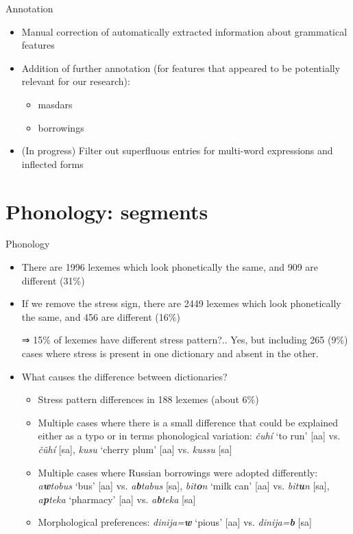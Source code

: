 \begin{frame}{Annotation}
\begin{itemize}
    \item Manual correction of automatically extracted information about grammatical features
    \item Addition of further annotation (for features that appeared to be potentially relevant for our research):
    \begin{itemize}
        \item masdars
        \item borrowings
    \end{itemize}
    \item (In progress) Filter out superfluous entries for multi-word expressions and inflected forms
\end{itemize}
    
\end{frame}

\section{Phonology: segments}
\begin{frame}{Phonology}
\begin{itemize}
    \item There are 1996 lexemes which look phonetically the same, and 909
are different (31\%)
    \item If we remove the stress sign, there are 2449 lexemes which look
phonetically the same, and 456 are different (16\%)
    \item[⇒] 15\% of lexemes have different stress pattern?.. \pause Yes, but including 265 (9\%) cases where stress is present in one dictionary and absent in the other.
    \item What causes the difference between dictionaries?
    \begin{itemize}
        \item Stress pattern differences in 188 lexemes (about 6\%)
        \item Multiple cases where there is a small difference that could be
explained either as a typo or in terms phonological variation: \textit{čuhí}
‘to run’ [aa] vs. \textit{čũhí} [sa], \textit{kusu} ‘cherry plum’ [aa] vs. \textit{kussu} [sa]
        \item Multiple cases where Russian borrowings were adopted differently: \textit{a\textbf{w}tobus} ‘bus’ [aa] vs. \textit{a\textbf{b}tabus} [sa], \textit{bit\textbf{o}n} ‘milk can’ [aa] vs. \textit{bit\textbf{u}n} [sa], \textit{a\textbf{p}teka} ‘pharmacy’ [aa] vs. \textit{a\textbf{b}teka} [sa]
        \item Morphological preferences: \textit{dinija=\textbf{w}} ‘pious’ [aa] vs. \textit{dinija=\textbf{b}} [sa]
    \end{itemize}

\end{itemize}    
\end{frame}

